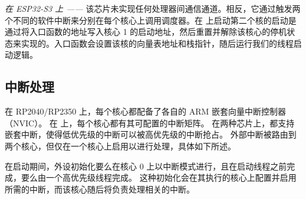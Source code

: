 
\noindent \textit{在 ESP32-S3 上 ——} 该芯片未实现任何处理器间通信通道。相反，它通过触发两个不同的软件中断来分别在每个核心上调用调度器。在 \espsthree{} 上启动第二个核的启动是通过将入口函数的地址写入核心 1 的启动地址，然后重置并解除该核心的停机状态来实现的。入口函数会设置该核的向量表地址和栈指针，随后运行我们的线程启动逻辑。

\subsection{中断处理}

在 RP2040/RP2350 上，每个核心都配备了各自的 ARM 嵌套向量中断控制器（NVIC）。
在 \espsthree{} 上，每个核心都有其可配置的中断矩阵。
在两种芯片上，都支持嵌套中断，使得低优先级的中断可以被高优先级的中断抢占。
外部中断被路由到两个核心，但仅在一个核心上启用以进行处理，具体如下所述。


在启动期间，外设初始化要么在核心 0 上以中断模式进行，且在启动线程之前完成，要么由一个高优先级线程完成。%
这种初始化会在其执行的核心上配置并启用所需的中断，而该核心随后将负责处理相关的中断。

